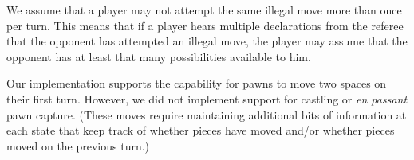 \documentclass[times, 10pt,twocolumn]{article}
\begin{document}
We assume that a player may not attempt the same illegal move more than once per turn.  This means that if a player
hears multiple declarations from the referee that the opponent has attempted an illegal move, the player may assume that
the opponent has at least that many possibilities available to him.

Our implementation supports the capability for pawns to move two spaces on their first turn.  However, we did not
implement support for castling or {\em en passant} pawn capture.  (These moves require maintaining additional bits of
information at each state that keep track of whether pieces have moved and/or whether pieces moved on the previous
turn.) 

\end{document}
